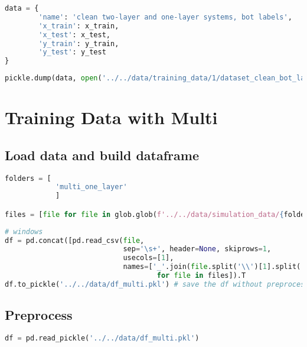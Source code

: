 \begin{lstlisting}[language=Python]
data = {
        'name': 'clean two-layer and one-layer systems, bot labels',
        'x_train': x_train,
        'x_test': x_test,
        'y_train': y_train,
        'y_test': y_test
}
\end{lstlisting}

\begin{lstlisting}[language=Python]
pickle.dump(data, open('../../data/training_data/1/dataset_clean_bot_layer.pkl', 'wb'))
\end{lstlisting}

\hypertarget{training-data-with-multi}{%
\section*{Training Data with Multi}\label{training-data-with-multi}}

\hypertarget{load-data-and-build-dataframe}{%
\subsection*{Load data and build
dataframe}\label{load-data-and-build-dataframe}}

\begin{lstlisting}[language=Python]
folders = [
            'multi_one_layer'
            ]

files = [file for file in glob.glob(f'../../data/simulation_data/{folders[0]}/*.spc')]
\end{lstlisting}

\begin{lstlisting}[language=Python]
# windows
df = pd.concat([pd.read_csv(file,
                            sep='\s+', header=None, skiprows=1,
                            usecols=[1],
                            names=['_'.join(file.split('\\')[1].split('_')[:-1])]).T 
                                    for file in files]).T
df.to_pickle('../../data/df_multi.pkl') # save the df without preprocessing
\end{lstlisting}

\hypertarget{preprocess}{%
\subsection*{Preprocess}\label{preprocess}}

\begin{lstlisting}[language=Python]
df = pd.read_pickle('../../data/df_multi.pkl')
\end{lstlisting}

